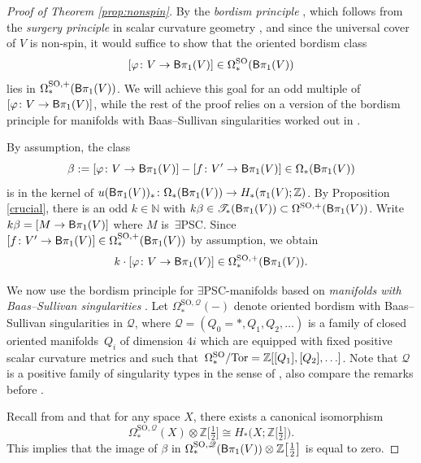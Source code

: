 \documentclass[pdftex]{sigma}
\numberwithin{equation}{section}
\newcommand{\Z}{\mathbb{Z}}
\newcommand{\N}{\mathbb{N}}
\newcommand{\SO}{\mathrm{SO}}
\newcommand{\sB}{{\sf B}}
\newcommand{\Tor}{{\rm Tor}}
\newcommand{\yes}{{\color {blue!70!black}$\exists$}{\sf PSC}}
\begin{document}
\begin{proof}[Proof of Theorem \ref{prop:nonspin}]
By the {\em bordism principle} \cite[Theorem 1.5]{R-S1995}, which follows from the {\em surgery principle} in scalar curvature geometry \cite{GL,SY}, and since the universal cover of $V$ is non-spin, it would suffice to show that the oriented bordism class
\[
 [ \varphi \colon V \to \sB \pi_1(V)] \in \Omega^{\SO}_*( \sB \pi_1(V))
\]
lies in $\Omega^{\SO, +}_*( \sB \pi_1(V))$.
We will achieve this goal for an odd multiple of $[ \varphi \colon V \to {\sf B} \pi_1(V)]$, while the rest of the proof relies on a version of the bordism principle for manifolds with Baas--Sullivan singularities worked out in \cite{Han20}.

By assumption, the class
\[
 \beta := [ \varphi \colon V \to \sB \pi_1(V) ] - [f \colon V' \to \sB \pi_1(V) ] \in \Omega_*( \sB \pi_1(V))
\]
is in the kernel of $u(\sB \pi_1 (V))_* \colon \Omega_*(\sB \pi_1(V)) \to H_*(\pi_1(V) ; \Z)$.
By Proposition \ref{crucial}, there is an odd $k \in \N$ with $k \beta \in \mathscr{T}_*(\sB \pi_1(V)) \subset \Omega^{\SO, +} ( \sB \pi_1(V)) $.
Write $k \beta = [ M \to \sB \pi_1(V)]$ where $M$ is~\yes.
Since $[f \colon V' \to \sB \pi_1(V) ] \in \Omega^{\SO,+}_*( \sB \pi_1(V))$ by assumption, we obtain
\[
 k\cdot [ \varphi \colon V \to \sB \pi_1(V) ] \in \Omega^{\SO, +}_*( \sB \pi_1(V)) .
\]

We now use the bordism principle for \yes-manifolds based on {\em manifolds with Baas--Sullivan singularities} \cite[Proposition 3.11]{Han20}.
Let $\Omega^{\SO, \mathscr{Q}}_*(-)$ denote oriented bordism with Baas--Sullivan singularities in $\mathscr{Q}$, where $\mathscr{Q} = (Q_0 = *, Q_1, Q_2, \ldots)$ is a family of closed oriented manifolds~$Q_i$ of dimension $4i$ which are equipped with fixed positive scalar curvature metrics and such that~${\Omega^{\SO}_* / \Tor = \Z [[Q_1], [Q_2], \ldots]}$.
Note that $\mathscr{Q}$ is a positive family of singularity types in the sense of \cite[Definition 3.2]{Han20}, also compare the remarks before \cite[Definition 3.12]{Han20}.

Recall from \cite{baas1} and \cite[Proposition 2.6]{Han20} that for any space $X$, there exists a canonical isomorphism
\[
 \Omega^{\SO, \mathscr{Q}}_*(X) \otimes \Z\big[\tfrac{1}{2}\big] \cong H_*\big(X; \Z\big[\tfrac{1}{2}\big] \big) .
 \]
This implies that the image of $\beta$ in $\Omega^{\SO, \mathscr{Q}}_*( \sB \pi_1(V)) \otimes \Z\big[\tfrac{1}{2}\big]$ is equal to zero.


\end{proof}
\end{document}
